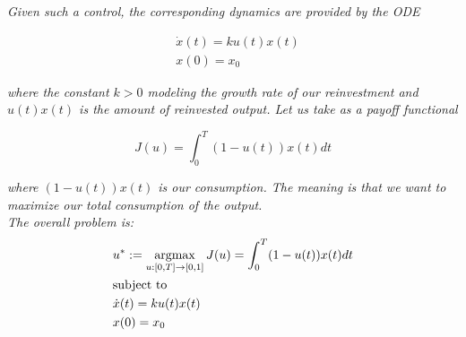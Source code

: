 \emph{Given such a control, the corresponding dynamics are provided by the ODE}

\begin{align}
    &\Dot{x}(t) = ku(t)x(t) \\
    &x(0) = x_0
\end{align}

\emph{where the constant $k >0$ modeling the growth rate of our reinvestment and $u(t)x(t)$ is the amount of reinvested output. Let us take as a payoff functional}

\begin{equation}
    J(u) = \int_0^T (1 - u(t))x(t)dt
\end{equation}

\emph{where $(1-u(t))x(t)$ is our consumption. The meaning is that we want to maximize our total consumption of the output.}\\
\emph{The overall problem is:}
\begin{align}
    &u^* := \operatorname*{argmax}_{u:[0,T] \to [0,1]} J(u) = \int_0^T (1-u(t))x(t)dt \\
    &\text{subject to}\\
    &\Dot{x}(t) = ku(t)x(t)\\
    &x(0)=x_0
\end{align}

